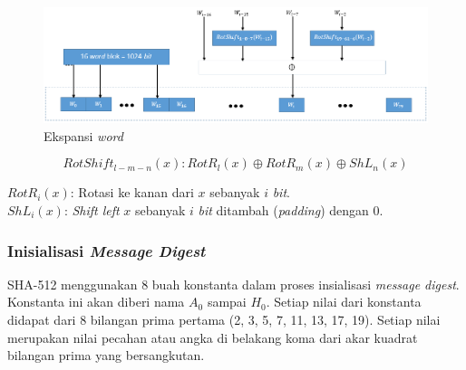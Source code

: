 \begin{figure}[ht]
	\includegraphics[scale=0.4]{Gambar/word_expansion}
	\centering
	\caption{Ekspansi \textit{word}}
\end{figure}

\begin{displaymath}
	RotShift_{l-m-n}(x):RotR_l(x) \oplus RotR_m(x) \oplus ShL_n(x)
\end{displaymath}

\noindent \begin{math}RotR_i(x)\end{math}: Rotasi ke kanan dari \begin{math}x\end{math} sebanyak \begin{math}i\end{math} \textit{bit}.\\
\begin{math}ShL_i(x)\end{math}: \textit{Shift left} \begin{math}x\end{math} sebanyak \begin{math}i\end{math} \textit{bit} ditambah (\textit{padding}) dengan 0.

\subsubsection{Inisialisasi \textit{Message Digest}}
SHA-512 menggunakan 8 buah konstanta dalam proses insialisasi \textit{message digest}. Konstanta ini akan diberi nama \begin{math}A_0\end{math} sampai \begin{math}H_0\end{math}. Setiap nilai dari konstanta didapat dari 8 bilangan prima pertama (2, 3, 5, 7, 11, 13, 17, 19). Setiap nilai merupakan nilai pecahan atau angka di belakang koma dari akar kuadrat bilangan prima yang bersangkutan.

